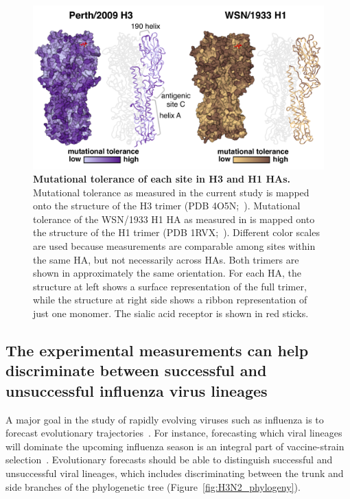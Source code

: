 \documentclass[9pt,twocolumn,twoside]{pnas-new}
\begin{document}
\begin{figure}
\centering
\includegraphics[width=\columnwidth]{figs/mut_tolerance/entropy_heatmap.pdf}
\caption{\label{fig:mut_tolerance}
{\bf Mutational tolerance of each site in H3 and H1 HAs.}
Mutational tolerance as measured in the current study is mapped onto the structure of the H3 trimer (PDB 4O5N;~\cite{lee2014receptor}).
Mutational tolerance of the WSN/1933 H1 HA as measured in \cite{doud2016accurate} is mapped onto the structure of the H1 trimer (PDB 1RVX;~\cite{gamblin2004structure}).
Different color scales are used because measurements are comparable among sites within the same HA, but not necessarily across HAs.
Both trimers are shown in approximately the same orientation. 
For each HA, the structure at left shows a surface representation of the full trimer, while the structure at right side shows a ribbon representation of just one monomer.
The sialic acid receptor is shown in red sticks.
}
\end{figure}

\subsection*{The experimental measurements can help discriminate between successful and unsuccessful influenza virus lineages}
A major goal in the study of rapidly evolving viruses such as influenza is to forecast evolutionary trajectories~\cite{lassig2017predicting,morris2017predictive}.
For instance, forecasting which viral lineages will dominate the upcoming influenza season is an integral part of vaccine-strain selection~\cite{neher2015nextflu,lassig2017predicting,morris2017predictive}.
Evolutionary forecasts should be able to distinguish successful and unsuccessful viral lineages, which includes discriminating between the trunk and side branches of the phylogenetic tree (Figure~\ref{fig:H3N2_phylogeny}).
\end{document}
